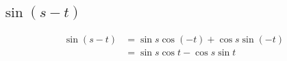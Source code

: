 \documentclass{exam}
\begin{document}
  \subsection{$\sin(s - t)$}
  \begin{align*}
    \sin(s - t) & = \sin s \cos (-t) + \cos s \sin (-t) \\
                & = \sin s \cos t - \cos s \sin t \\
  \end{align*}
\end{document}

